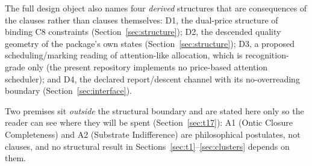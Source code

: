 \documentclass[11pt]{article}
\theoremstyle{definition}
\begin{document}
The full design object also names four \emph{derived} structures that are
consequences of the clauses rather than clauses themselves: D1, the dual-price
structure of binding C8 constraints (Section~\ref{sec:structure}); D2, the
descended quality geometry of the package's own states
(Section~\ref{sec:structure}); D3, a proposed scheduling/marking reading of
attention-like allocation, which is recognition-grade only (the present
repository implements no price-based attention scheduler); and D4, the declared
report/descent channel with its no-overreading boundary
(Section~\ref{sec:interface}).

Two premises sit \emph{outside} the structural boundary and are
stated here only so the reader can see where they will be spent
(Section~\ref{sec:t17}): A1 (Ontic Closure Completeness) and A2 (Substrate
Indifference) are philosophical postulates, not clauses, and no structural
result in Sections~\ref{sec:t1}--\ref{sec:clusters} depends on them.
\end{document}
